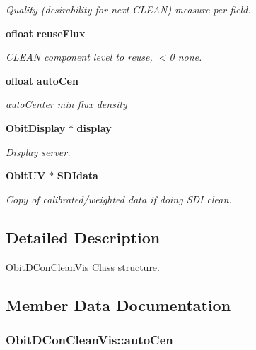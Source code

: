 \begin{CompactItemize}
\begin{CompactList}\small\item\em Quality (desirability for next CLEAN) measure per field. \item\end{CompactList}\item 
{\bf ofloat} {\bf reuse\-Flux}
\begin{CompactList}\small\item\em CLEAN component level to reuse, $<$0 none. \item\end{CompactList}\item 
{\bf ofloat} {\bf auto\-Cen}
\begin{CompactList}\small\item\em auto\-Center min flux density \item\end{CompactList}\item 
{\bf Obit\-Display} $\ast$ {\bf display}
\begin{CompactList}\small\item\em Display server. \item\end{CompactList}\item 
{\bf Obit\-UV} $\ast$ {\bf SDIdata}
\begin{CompactList}\small\item\em Copy of calibrated/weighted data if doing SDI clean. \item\end{CompactList}\end{CompactItemize}


\subsection{Detailed Description}
Obit\-DCon\-Clean\-Vis Class structure. 



\subsection{Member Data Documentation}
\subsubsection{ {\bf Obit\-DCon\-Clean\-Vis::auto\-Cen}}\label{structObitDConCleanVis_o48}



